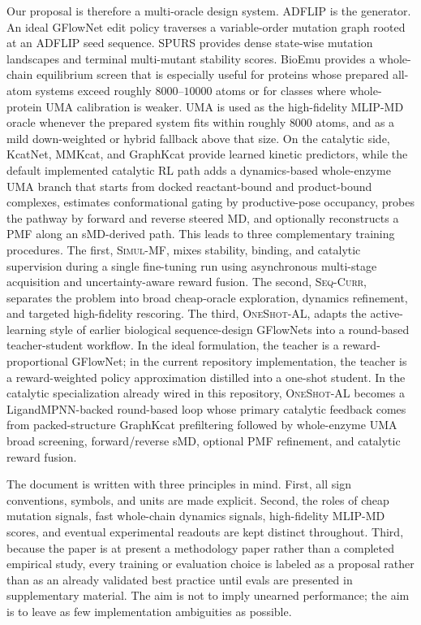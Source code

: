 \documentclass[11pt]{article}
\newcommand{\methodI}{\textsc{Simul-MF}}
\newcommand{\methodII}{\textsc{Seq-Curr}}
\newcommand{\methodIII}{\textsc{OneShot-AL}}
\begin{document}
	Our proposal is therefore a multi-oracle design system. ADFLIP is the generator. An ideal GFlowNet edit policy traverses a variable-order mutation graph rooted at an ADFLIP seed sequence. SPURS provides dense state-wise mutation landscapes and terminal multi-mutant stability scores. BioEmu provides a whole-chain equilibrium screen that is especially useful for proteins whose prepared all-atom systems exceed roughly $8000$--$10000$ atoms or for classes where whole-protein UMA calibration is weaker. UMA is used as the high-fidelity MLIP-MD oracle whenever the prepared system fits within roughly $8000$ atoms, and as a mild down-weighted or hybrid fallback above that size. On the catalytic side, KcatNet, MMKcat, and GraphKcat provide learned kinetic predictors, while the default implemented catalytic RL path adds a dynamics-based whole-enzyme UMA branch that starts from docked reactant-bound and product-bound complexes, estimates conformational gating by productive-pose occupancy, probes the pathway by forward and reverse steered MD, and optionally reconstructs a PMF along an sMD-derived path. This leads to three complementary training procedures. The first, \methodI, mixes stability, binding, and catalytic supervision during a single fine-tuning run using asynchronous multi-stage acquisition and uncertainty-aware reward fusion. The second, \methodII, separates the problem into broad cheap-oracle exploration, dynamics refinement, and targeted high-fidelity rescoring. The third, \methodIII, adapts the active-learning style of earlier biological sequence-design GFlowNets \citep{jain2022bioseqgfn} into a round-based teacher-student workflow. In the ideal formulation, the teacher is a reward-proportional GFlowNet; in the current repository implementation, the teacher is a reward-weighted policy approximation distilled into a one-shot student. In the catalytic specialization already wired in this repository, \methodIII{} becomes a LigandMPNN-backed round-based loop whose primary catalytic feedback comes from packed-structure GraphKcat prefiltering followed by whole-enzyme UMA broad screening, forward/reverse sMD, optional PMF refinement, and catalytic reward fusion.
	
	The document is written with three principles in mind. First, all sign conventions, symbols, and units are made explicit. Second, the roles of cheap mutation signals, fast whole-chain dynamics signals, high-fidelity MLIP-MD scores, and eventual experimental readouts are kept distinct throughout. Third, because the paper is at present a methodology paper rather than a completed empirical study, every training or evaluation choice is labeled as a proposal rather than as an already validated best practice until evals are presented in supplementary material. The aim is not to imply unearned performance; the aim is to leave as few implementation ambiguities as possible.
	
\end{document}

